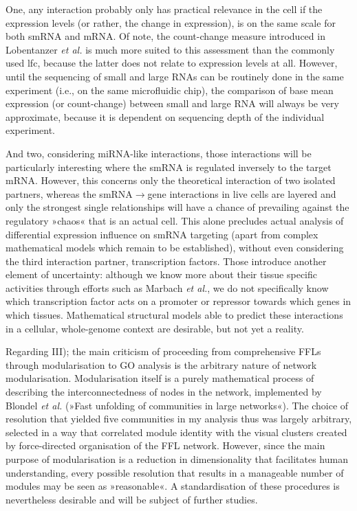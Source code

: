 One, any interaction probably only has practical relevance in the cell if the expression levels (or rather, the change in expression), is on the same scale for both smRNA and mRNA. Of note, the count-change measure introduced in Lobentanzer \emph{et al.}\cite{Lobentanzer2019a} is much more suited to this assessment than the commonly used \ac{lfc}, because the latter does not relate to expression levels at all. However, until the sequencing of small and large RNAs can be routinely done in the same experiment (i.e., on the same microfluidic chip), the comparison of base mean expression (or count-change) between small and large RNA will always be very approximate, because it is dependent on sequencing depth of the individual experiment. 

And two, considering miRNA-like interactions, those interactions will be particularly interesting where the smRNA is regulated inversely to the target mRNA. However, this concerns only the theoretical interaction of two isolated partners, whereas the smRNA$\to$gene interactions in live cells are layered and only the strongest single relationships will have a chance of prevailing against the regulatory »chaos« that is an actual cell. This alone precludes actual analysis of differential expression influence on smRNA targeting (apart from complex mathematical models which remain to be established), without even considering the third interaction partner, transcription factors. Those introduce another element of uncertainty: although we know more about their tissue specific activities through efforts such as Marbach \emph{et al.}\cite{Marbach2016}, we do not specifically know which transcription factor acts on a promoter or repressor towards which genes in which tissues. Mathematical structural models able to predict these interactions in a cellular, whole-genome context are desirable, but not yet a reality.

Regarding III); the main criticism of proceeding from comprehensive FFLs through modularisation to GO analysis is the arbitrary nature of network modularisation. Modularisation itself is a purely mathematical process of describing the interconnectedness of nodes in the network, implemented by Blondel \emph{et al.} (»Fast unfolding of communities in large networks«).\cite{Blondel2008} The choice of resolution that yielded five communities in my analysis thus was largely arbitrary, selected in a way that correlated module identity with the visual clusters created by force-directed organisation of the FFL network. However, since the main purpose of modularisation is a reduction in dimensionality that facilitates human understanding, every possible resolution that results in a manageable number of modules may be seen as »reasonable«. A standardisation of these procedures is nevertheless desirable and will be subject of further studies.

